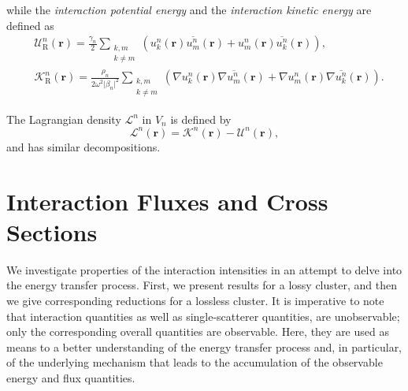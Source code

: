 \documentclass{article}
\begin{document}
%
while the \emph{interaction potential energy} and the \emph{interaction kinetic energy} are defined as
%
\begin{align}\label{potential_interaction}
    &\mathcal{U}^n_{\mathrm{R}}(\mathbf{r})=\frac{\gamma_n}{2}\sum_{\substack{k,m\\k\ne m}}\left(u_k^{n}(\mathbf{r})\overline{u_m^{n}}(\mathbf{r})+u_m^{n}(\mathbf{r})\overline{u_k^{n}}(\mathbf{r})\right),\\
    &\mathcal{K}^n_{\mathrm{R}}(\mathbf{r})=\frac{\rho_n}{2\omega^2\lvert \beta_n\rvert^2}\sum_{\substack{k,m\\k\ne m}}\left(\nabla u_k^{n}(\mathbf{r})\nabla\overline{u_m^{n}}(\mathbf{r})+\nabla u_m^{n}(\mathbf{r})\nabla\overline{u_k^{n}}(\mathbf{r})\right).
    \label{kinetic_interaction}
\end{align}
%

The Lagrangian density $\mathcal{L}^n$ in $V_n$ is defined by
\begin{equation}
    \mathcal{L}^n(\mathbf{r})=\mathcal{K}^n(\mathbf{r})-\mathcal{U}^n(\mathbf{r}),%
\end{equation}
%
and has similar decompositions.

\section{Interaction Fluxes and Cross Sections}
%
We investigate properties of the interaction intensities in an attempt to delve into the energy transfer process. First, we present results for a lossy cluster, and then we give corresponding reductions for a lossless cluster. It is imperative to note that interaction quantities as well as single-scatterer quantities, are unobservable; only the corresponding overall quantities are observable. Here, they are used as means to a better understanding of the energy transfer process and, in particular, of the underlying mechanism that leads to the accumulation of the observable energy and flux quantities. 
\end{document}
